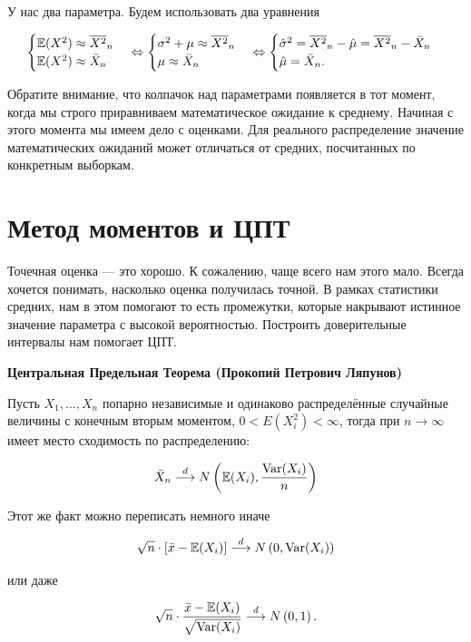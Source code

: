 \documentclass[12pt, a4paper, oneside]{article}
\begin{document}
\begin{sol}
У нас два параметра. Будем использовать два уравнения

\[
\begin{cases} 
\mathbb{E}(X^2) \approx \overline{X^2}_n   \\
\mathbb{E}(X^2) \approx  \bar{X}_n 
\end{cases} \Leftrightarrow \begin{cases} 
\sigma^2 + \mu \approx \overline{X^2}_n   \\
 \mu \approx \bar{X}_n
\end{cases}  \Leftrightarrow \begin{cases} 
 \hat{\sigma}^2 = \overline{X^2}_n - \hat{\mu} = \overline{X^2}_n - \bar{X}_n \\
\hat{\mu} = \bar{X}_n.
\end{cases}
\]

Обратите внимание, что колпачок над параметрами появляется в тот момент, когда мы строго приравниваем математическое ожидание к среднему. Начиная с этого момента мы имеем дело с оценками. Для реального распределение значение математических ожиданий может отличаться от средних, посчитанных по конкретным выборкам. 
\end{sol} 


\section{Метод моментов и ЦПТ}

Точечная оценка --- это хорошо. К сожалению, чаще всего нам этого мало. Всегда хочется понимать, насколько оценка получилась точной. В рамках статистики средних, нам в этом помогают  то есть промежутки, которые накрывают истинное значение параметра с высокой вероятностью. Построить доверительные интервалы нам помогает ЦПТ.

\begin{theorem}{\textbf{Центральная Предельная Теорема (Прокопий Петрович Ляпунов)}}

Пусть $X_1, \ldots, X_n$ попарно независимые и одинаково распределённые случайные величины с конечным вторым моментом, $0 < E(X_i^2) < \infty$, тогда при $n \to \infty$ имеет место сходимость по распределению: 

\[
\bar{X}_n \stackrel{d}{\longrightarrow} N \left(\mathbb{E}(X_i), \frac{\operatorname{Var}(X_i)}{n} \right)
\]

Этот же факт можно переписать немного иначе

\[
\sqrt{n} \cdot [\bar{x} - \mathbb{E}(X_i)]  \stackrel{d}{\longrightarrow} N \left(0, \operatorname{Var}(X_i)\right)
\]

или даже 

\[
\sqrt{n} \cdot \frac{\bar{x} - \mathbb{E}(X_i)}{\sqrt{\operatorname{Var}(X_i)}}  \stackrel{d}{\longrightarrow} N \left(0, 1\right).
\]
\end{theorem}
\end{document}
